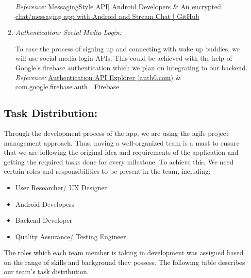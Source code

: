 \documentclass[conference]{IEEEtran}
\begin{document}
\begin{enumerate}
   \textit{Reference:} \href{https://developer.android.com/reference/androidx/core/app/NotificationCompat.MessagingStyle} {MessagingStyle API| Android Developers} \&  \href{https://github.com/astrotars/stream-android-encrypted-chat}{An encrypted chat/messaging app with Android and Stream Chat | GitHub}\\
   
   \item \textit{Authentication: Social Media Login:}\par
    To ease the process of signing up and connecting with wake up buddies, we will use social media login APIs. This could be achieved with the help of Google’s firebase authentication which we plan on integrating to our backend.\\
    
   \textit{Reference:} \href{https://auth0.com/docs/api/authentication} {Authentication API Explorer (auth0.com)} \&  \href{https://firebase.google.com/docs/reference/android/com/google/firebase/auth/package-summary}{com.google.firebase.auth  |  Firebase}\\
    
\end{enumerate}

\subsection{Task Distribution:}
Through the development process of the app, we are using the agile project management approach. Thus, having a well-organized team is a must to ensure that we are following the original idea and requirements of the application and getting the required tasks done for every milestone. To achieve this, We need certain roles and responsibilities to be present in the team, including:
\begin{itemize}
    \item User Researcher/ UX Designer
    \item Android Developers
    \item Backend Developer
    \item Quality Assurance/ Testing Engineer

\end{itemize}
\vspace{10px}
The roles which each team member is taking in development was assigned based on the range of skills and background they possess. The following table describes our team’s task distribution. \\
\end{document}
